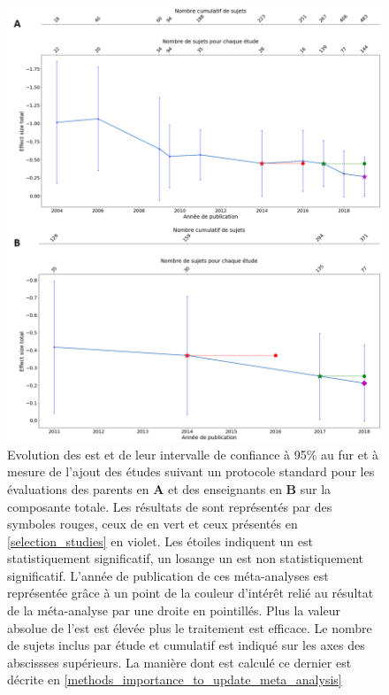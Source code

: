 \begin{figure}[h!]
  \centering
	\includegraphics[width=1\linewidth]{figures/chapter-2/meta-analysis-evolution-summary-effect-std} 
  \caption{Evolution des \gls{est} et de leur intervalle de confiance à 95\% au fur et à mesure de l'ajout des études suivant un protocole standard pour les évaluations des 
	parents en \textbf{A} et des enseignants en \textbf{B} sur la composante totale.
  Les résultats de \citep{Cortese2016} sont représentés par des symboles rouges, ceux de \citet{Bussalb2019clinical} en vert et ceux présentés en \ref{selection_studies} en violet. Les étoiles 
	indiquent un \gls{est} statistiquement significatif, un losange un \gls{est} non statistiquement significatif. L'année de publication de ces méta-analyses est représentée grâce à un point de la couleur 
	d'intérêt relié au résultat de la méta-analyse par une droite en pointillés.
	Plus la valeur absolue de l'\gls{est} est élevée plus le traitement est efficace.
	Le nombre de sujets inclus par étude et cumulatif est indiqué sur les axes des abscissses supérieurs. La manière dont est calculé ce dernier est 
	décrite en \ref{methods_importance_to_update_meta_analysis}}
  \label{Figure:meta_analysis_evolution_est_std}
\end{figure}

